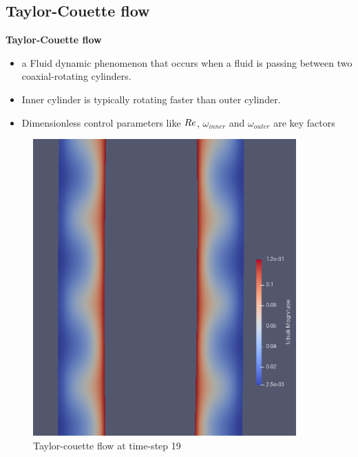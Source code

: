 \documentclass[aspectratio=169]{beamer}
\begin{document}
\subsection{Taylor-Couette flow}
\begin{frame}
  \begin{minipage}{0.45\textwidth}
    \large \color{TUCgreen}\textbf{Taylor-Couette flow}
    \begin{itemize}
      \item a Fluid dynamic phenomenon that occurs when a fluid is passing between two coaxial-rotating cylinders.
      \item Inner cylinder is typically rotating faster than outer cylinder.
      \item Dimensionless control parameters like \(\mathnormal{Re}\), $\omega_{inner}$ and $\omega_{outer}$  are key factors
    \end{itemize}
  \end{minipage}
  \begin{minipage}{0.45\textwidth}
    \vspace{-0.5 cm}
    \centering
    \begin{figure}[h]
      \includegraphics[width=0.9\textwidth]{Taylor_merve_vortex.png}
      \caption{\tiny{Taylor-couette flow at time-step 19}}
    \end{figure}
  \end{minipage}
\end{frame}
\end{document}
